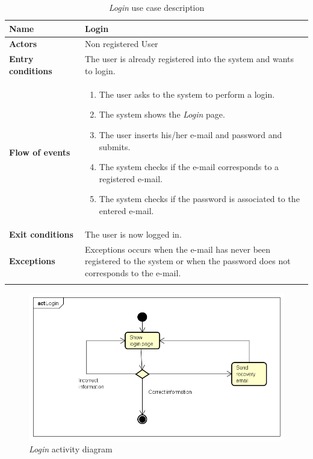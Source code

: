 \begin{longtable}{p{0.25\linewidth}|p{0.75\linewidth}}
	\hline
	\label{tab:loginTAB}
	\textbf{Name} & \textbf{Login} \\
	\hline
	\textbf{Actors} & Non registered User \\
	\hline
	\textbf{Entry conditions} & The user is already registered into the system and wants to login. \\
	\hline
	\textbf{Flow of events} & 
	\begin{enumerate}
		\item The user asks to the system to perform a login.
		\item The system shows the \emph{Login} page.
		\item The user inserts his/her e-mail and password and submits.
		\item The system checks if the e-mail corresponds to a registered e-mail.
		\item The system checks if the password is associated to the entered e-mail.
	\end{enumerate}\\
	\hline
	\textbf{Exit conditions} & The user is now logged in.\\
	\hline
	\textbf{Exceptions} & Exceptions occurs when the e-mail has never been registered to the system or when the password does not corresponds to the e-mail.\\
	\hline
	\caption{\emph{Login} use case description}
\end{longtable}

\begin{figure}
	\includegraphics[width=\textwidth, height=\textheight, keepaspectratio=true]{Img/LoginAC}
	\caption{\emph{Login} activity diagram}
	\label{fig:loginac}
\end{figure}

